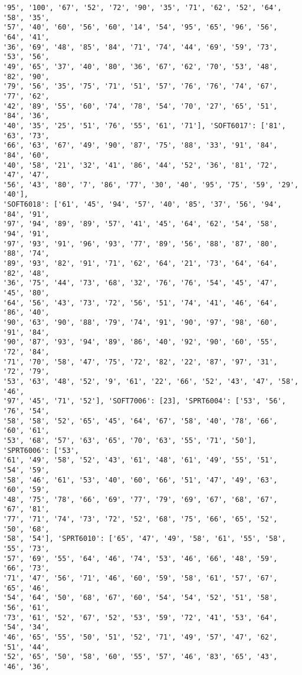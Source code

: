 \documentclass[11pt]{article}
\begin{document}
\begin{Verbatim}[commandchars=\\\{\}]
'95', '100', '67', '52', '72', '90', '35', '71', '62', '52', '64', '58', '35',
'57', '40', '60', '56', '60', '14', '54', '95', '65', '96', '56', '64', '41',
'36', '69', '48', '85', '84', '71', '74', '44', '69', '59', '73', '53', '56',
'49', '65', '37', '40', '80', '36', '67', '62', '70', '53', '48', '82', '90',
'79', '56', '35', '75', '71', '51', '57', '76', '76', '74', '67', '77', '62',
'42', '89', '55', '60', '74', '78', '54', '70', '27', '65', '51', '84', '36',
'40', '35', '25', '51', '76', '55', '61', '71'], 'SOFT6017': ['81', '63', '73',
'66', '63', '67', '49', '90', '87', '75', '88', '33', '91', '84', '84', '60',
'40', '58', '21', '32', '41', '86', '44', '52', '36', '81', '72', '47', '47',
'56', '43', '80', '7', '86', '77', '30', '40', '95', '75', '59', '29', '40'],
'SOFT6018': ['61', '45', '94', '57', '40', '85', '37', '56', '94', '84', '91',
'97', '94', '89', '89', '57', '41', '45', '64', '62', '54', '58', '94', '91',
'97', '93', '91', '96', '93', '77', '89', '56', '88', '87', '80', '88', '74',
'89', '93', '82', '91', '71', '62', '64', '21', '73', '64', '64', '82', '48',
'36', '75', '44', '73', '68', '32', '76', '76', '54', '45', '47', '45', '80',
'64', '56', '43', '73', '72', '56', '51', '74', '41', '46', '64', '86', '40',
'90', '63', '90', '88', '79', '74', '91', '90', '97', '98', '60', '91', '84',
'90', '87', '93', '94', '89', '86', '40', '92', '90', '60', '55', '72', '84',
'71', '70', '58', '47', '75', '72', '82', '22', '87', '97', '31', '72', '79',
'53', '63', '48', '52', '9', '61', '22', '66', '52', '43', '47', '58', '46',
'97', '45', '71', '52'], 'SOFT7006': [23], 'SPRT6004': ['53', '56', '76', '54',
'58', '58', '52', '65', '45', '64', '67', '58', '40', '78', '66', '60', '61',
'53', '68', '57', '63', '65', '70', '63', '55', '71', '50'], 'SPRT6006': ['53',
'61', '49', '58', '52', '43', '61', '48', '61', '49', '55', '51', '54', '59',
'58', '46', '61', '53', '40', '60', '66', '51', '47', '49', '63', '60', '59',
'48', '75', '78', '66', '69', '77', '79', '69', '67', '68', '67', '67', '81',
'77', '71', '74', '73', '72', '52', '68', '75', '66', '65', '52', '50', '68',
'58', '54'], 'SPRT6010': ['65', '47', '49', '58', '61', '55', '58', '55', '73',
'57', '69', '55', '64', '46', '74', '53', '46', '66', '48', '59', '66', '73',
'71', '47', '56', '71', '46', '60', '59', '58', '61', '57', '67', '65', '46',
'54', '64', '50', '68', '67', '60', '54', '54', '52', '51', '58', '56', '61',
'73', '61', '52', '67', '52', '53', '59', '72', '41', '53', '64', '54', '34',
'46', '65', '55', '50', '51', '52', '71', '49', '57', '47', '62', '51', '44',
'52', '65', '50', '58', '60', '55', '57', '46', '83', '65', '43', '46', '36',

\end{Verbatim}
\end{document}
